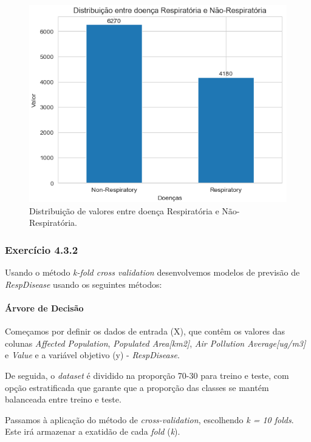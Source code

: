 \documentclass[conference]{IEEEtran}
\begin{document}
\begin{figure}[h]
	\centering
	\includegraphics[width=0.9\linewidth]{grafico_doenca_respir}
	\caption{Distribuição de valores entre doença Respiratória e Não-Respiratória.}
	\label{fig:grafico_doenca_respir}
\end{figure}


\medskip

\subsubsection{\textbf{Exercício 4.3.2}}

Usando o método \textit{k-fold cross validation} desenvolvemos modelos de previsão de \textit{RespDisease} usando os seguintes métodos:

\medskip

\paragraph{Árvore de Decisão}

Começamos por definir os dados de entrada (X), que contêm os valores das colunas \textit{Affected Population}, \textit{Populated Area[km2]}, \textit{Air Pollution Average[ug/m3]} e \textit{Value}  e a variável objetivo (y) - \textit{RespDisease}.

De seguida, o \textit{dataset} é dividido na proporção 70-30 para treino e teste, com opção estratificada que garante que a proporção das classes se mantém balanceada entre treino e teste.

Passamos à aplicação do método de \textit{cross-validation}, escolhendo \textit{k = 10 folds}. Este irá armazenar a exatidão de cada \textit{fold} (\textit{k}).
\end{document}
